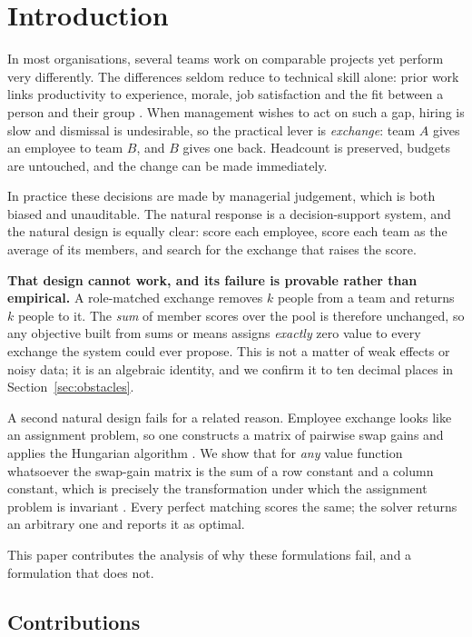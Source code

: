 \documentclass[conference]{IEEEtran}
\begin{document}
\section{Introduction}

In most organisations, several teams work on comparable projects yet perform
very differently. The differences seldom reduce to technical skill alone: prior
work links productivity to experience, morale, job satisfaction and the fit
between a person and their group \cite{harter2002,judge2001,kristof2005}. When
management wishes to act on such a gap, hiring is slow and dismissal is
undesirable, so the practical lever is \emph{exchange}: team $A$ gives an
employee to team $B$, and $B$ gives one back. Headcount is preserved, budgets are
untouched, and the change can be made immediately.

In practice these decisions are made by managerial judgement, which is both
biased and unauditable. The natural response is a decision-support system, and
the natural design is equally clear: score each employee, score each team as the
average of its members, and search for the exchange that raises the score.

\textbf{That design cannot work, and its failure is provable rather than
empirical.} A role-matched exchange removes $k$ people from a team and returns
$k$ people to it. The \emph{sum} of member scores over the pool is therefore
unchanged, so any objective built from sums or means assigns \emph{exactly} zero
value to every exchange the system could ever propose. This is not a matter of
weak effects or noisy data; it is an algebraic identity, and we confirm it to ten
decimal places in Section~\ref{sec:obstacles}.

A second natural design fails for a related reason. Employee exchange looks like
an assignment problem, so one constructs a matrix of pairwise swap gains and
applies the Hungarian algorithm \cite{kuhn1955,munkres1957}. We show that for
\emph{any} value function whatsoever the swap-gain matrix is the sum of a row
constant and a column constant, which is precisely the transformation under which
the assignment problem is invariant \cite{burkard2009}. Every perfect matching
scores the same; the solver returns an arbitrary one and reports it as optimal.

This paper contributes the analysis of why these formulations fail, and a
formulation that does not.

\subsection*{Contributions}
\end{document}
